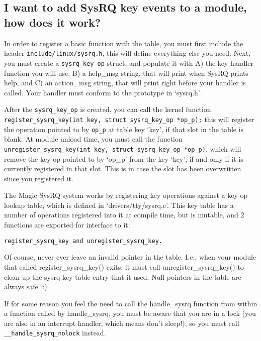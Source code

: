 \subsection{I want to add SysRQ key events to a module, how does it
work?}\label{i-want-to-add-sysrq-key-events-to-a-module-how-does-it-work}

In order to register a basic function with the table, you must first
include the header \texttt{include/linux/sysrq.h}, this will define
everything else you need. Next, you must create a
\texttt{sysrq\_key\_op} struct, and populate it with A) the key handler
function you will use, B) a help\_msg string, that will print when SysRQ
prints help, and C) an action\_msg string, that will print right before
your handler is called. Your handler must conform to the prototype in
`sysrq.h'.

After the \texttt{sysrq\_key\_op} is created, you can call the kernel
function
\texttt{register\_sysrq\_key(int\ key,\ struct\ sysrq\_key\_op\ *op\_p);}
this will register the operation pointed to by \texttt{op\_p} at table
key `key', if that slot in the table is blank. At module unload time,
you must call the function
\texttt{unregister\_sysrq\_key(int\ key,\ struct\ sysrq\_key\_op\ *op\_p)},
which will remove the key op pointed to by `op\_p' from the key `key',
if and only if it is currently registered in that slot. This is in case
the slot has been overwritten since you registered it.

The Magic SysRQ system works by registering key operations against a key
op lookup table, which is defined in `drivers/tty/sysrq.c'. This key
table has a number of operations registered into it at compile time, but
is mutable, and 2 functions are exported for interface to it:

\begin{verbatim}
register_sysrq_key and unregister_sysrq_key.
\end{verbatim}

Of course, never ever leave an invalid pointer in the table. I.e., when
your module that called register\_sysrq\_key() exits, it must call
unregister\_sysrq\_key() to clean up the sysrq key table entry that it
used. Null pointers in the table are always safe. :)

If for some reason you feel the need to call the handle\_sysrq function
from within a function called by handle\_sysrq, you must be aware that
you are in a lock (you are also in an interrupt handler, which means
don't sleep!), so you must call \texttt{\_\_handle\_sysrq\_nolock}
instead.

